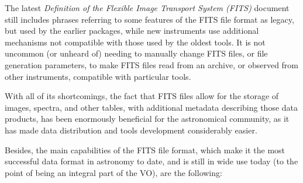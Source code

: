 			The latest \emph{Definition of the Flexible Image
			Transport System (FITS)}
			document~\cite{FITS-Working-Group:2008ty} still
			includes phrases referring to some features of the FITS
			file format as legacy, but used by the earlier
			packages, while new instruments use additional
			mechanisms not compatible with those used by the oldest
			tools. It is not uncommon (or unheard of) needing to
			manually change FITS files, or file generation
			parameters, to make FITS files read from an archive, or
			observed from other instruments, compatible with
			particular tools.
			
			 With all of its shortcomings, the fact that FITS files
			allow for the storage of images, spectra, and other
			tables, with additional metadata describing those data
			products, has been enormously beneficial for the
			astronomical community, as it has made data
			distribution and tools development considerably easier.
			
			 Besides, the main capabilities of the FITS file
			format, which make it the most successful data format
			in astronomy to date, and is still in wide use today
			(to the point of being an integral part of the VO), are
			the following:

		\newcommand{\fitsiourl}[0]
	{http://heasarc.gsfc.nasa.gov/docs/software/fitsio/fitsio.html}
		\newcommand{\nomtamfitsurl}[0]
	{http://heasarc.gsfc.nasa.gov/docs/heasarc/fits/java/v0.9/}
		\newcommand{\pyfitsurl}[0]
	{http://www.stsci.edu/resources/software_hardware/pyfits}

